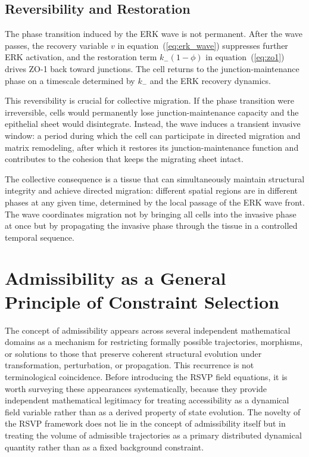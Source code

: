 \documentclass[11pt,a4paper]{article}
\theoremstyle{plain}
\theoremstyle{definition}
\begin{document}
\subsection{Reversibility and Restoration}

The phase transition induced by the ERK wave is not permanent. After the wave passes,
the recovery variable $v$ in equation~(\ref{eq:erk_wave}) suppresses further ERK
activation, and the restoration term $k_-(1-\phi)$ in equation~(\ref{eq:zo1}) drives
ZO-1 back toward junctions. The cell returns to the junction-maintenance phase on a
timescale determined by $k_-$ and the ERK recovery dynamics.

This reversibility is crucial for collective migration. If the phase transition were
irreversible, cells would permanently lose junction-maintenance capacity and the
epithelial sheet would disintegrate. Instead, the wave induces a transient invasive
window: a period during which the cell can participate in directed migration and matrix
remodeling, after which it restores its junction-maintenance function and contributes
to the cohesion that keeps the migrating sheet intact.

The collective consequence is a tissue that can simultaneously maintain structural
integrity and achieve directed migration: different spatial regions are in different
phases at any given time, determined by the local passage of the ERK wave front.
The wave coordinates migration not by bringing all cells into the invasive phase at once
but by propagating the invasive phase through the tissue in a controlled temporal sequence.

\section{Admissibility as a General Principle of Constraint Selection}
\label{sec:admissibility}

The concept of admissibility appears across several independent mathematical domains as
a mechanism for restricting formally possible trajectories, morphisms, or solutions to
those that preserve coherent structural evolution under transformation, perturbation,
or propagation. This recurrence is not terminological coincidence. Before introducing
the RSVP field equations, it is worth surveying these appearances systematically, because
they provide independent mathematical legitimacy for treating accessibility as a
dynamical field variable rather than as a derived property of state evolution. The
novelty of the RSVP framework does not lie in the concept of admissibility itself but
in treating the volume of admissible trajectories as a primary distributed dynamical
quantity rather than as a fixed background constraint.
\end{document}
